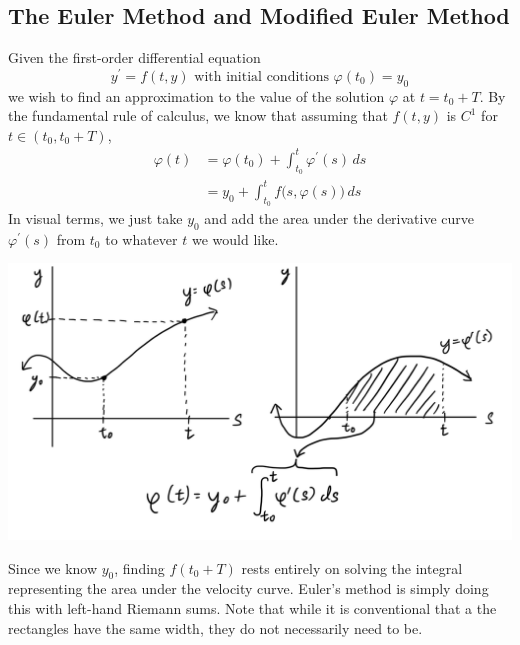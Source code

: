 \documentclass{article}
\theoremstyle{remark}
\theoremstyle{definition}
\begin{document}
\subsection{The Euler Method and Modified Euler Method}
Given the first-order differential equation
\[y^\prime = f(t, y) \text{ with initial conditions } \varphi(t_0) = y_0\]
we wish to find an approximation to the value of the solution $\varphi$ at $t = t_0 + T$. By the fundamental rule of calculus, we know that assuming that $f(t, y)$ is $C^1$ for $t \in (t_0, t_0 + T)$, 
\begin{align*}
    \varphi(t) & = \varphi(t_0) + \int_{t_0}^t \varphi^\prime (s) \,ds \\
    & = y_0 + \int_{t_0}^t f\big(s, \varphi(s) \big)\,ds
\end{align*}
In visual terms, we just take $y_0$ and add the area under the derivative curve $\varphi^\prime (s)$ from $t_0$ to whatever $t$ we would like. 
\begin{center}
    \includegraphics[scale=0.25]{img/Fundamental_Theorem_of_Calculus.PNG}
\end{center}
Since we know $y_0$, finding $f(t_0 + T)$ rests entirely on solving the integral representing the area under the velocity curve. Euler's method is simply doing this with left-hand Riemann sums. Note that while it is conventional that a the rectangles have the same width, they do not necessarily need to be. 
\end{document}
